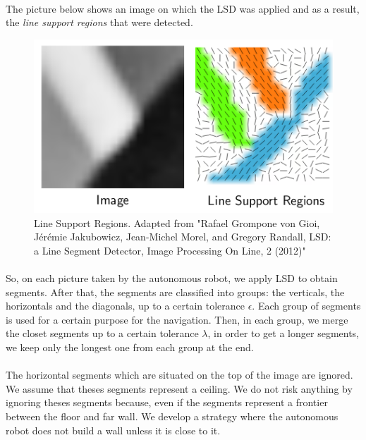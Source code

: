 \documentclass[12pt]{report}
\begin{document}
	  \paragraph{}
	  The picture below shows an image on which the LSD was applied and as a result, the \textit{line support regions} that were detected.
	  	\begin{figure}[H]
	  	\begin{center}
	  		\includegraphics[scale=0.6]{res/lsr.png}
	  		\caption{Line Support Regions. Adapted from "Rafael Grompone von Gioi, Jérémie Jakubowicz, Jean-Michel Morel, and Gregory Randall, LSD: a Line Segment Detector, Image Processing On Line, 2 (2012)" }
	  	\end{center}
	  \end{figure}
  \paragraph{}
  So, on each picture taken by the autonomous robot, we apply LSD to obtain segments. After that, the segments are classified into groups: the verticals, the horizontals and the diagonals, up to a certain tolerance $\epsilon$. Each group of segments is used for a certain purpose for the navigation. Then, in each group, we merge the closet segments up to a certain tolerance $\lambda$, in order to get a longer segments, we keep only the longest one from each group at the end. 
  
\paragraph{}
The horizontal segments which are situated on the top of the image are ignored. We assume that theses segments represent a ceiling. We do not risk anything by ignoring theses segments because, even if the segments represent a frontier between the floor and far wall. We develop a strategy where the autonomous robot does not build a wall unless it is close to it.
\end{document}
